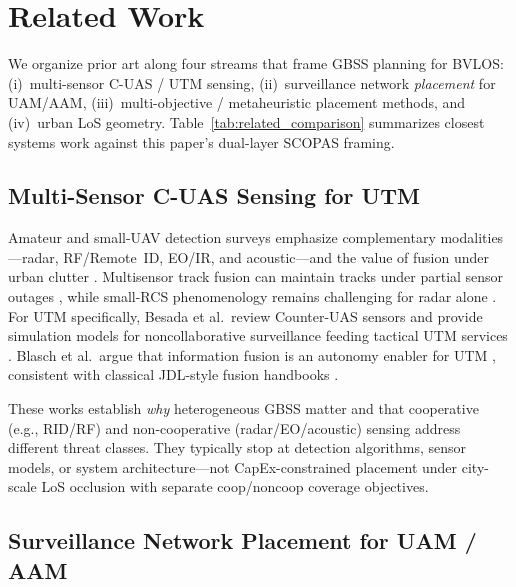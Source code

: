 
\section{Related Work}
\label{sec:related}

We organize prior art along four streams that frame GBSS planning for BVLOS: (i)~multi-sensor C-UAS / UTM sensing, (ii)~surveillance network \emph{placement} for UAM/AAM, (iii)~multi-objective / metaheuristic placement methods, and (iv)~urban LoS geometry. Table~\ref{tab:related_comparison} summarizes closest systems work against this paper's dual-layer SCOPAS framing.



\subsection{Multi-Sensor C-UAS Sensing for UTM}

Amateur and small-UAV detection surveys emphasize complementary modalities---radar, RF/Remote~ID, EO/IR, and acoustic---and the value of fusion under urban clutter \cite{guvenc2018detection,yan2023passive}. Multisensor track fusion can maintain tracks under partial sensor outages \cite{jovanoska2018multisensor,dudczyk2022multisensor}, while small-RCS phenomenology remains challenging for radar alone \cite{semkin2020analyzing}. For UTM specifically, Besada et al.\ review Counter-UAS sensors and provide simulation models for noncollaborative surveillance feeding tactical UTM services \cite{besada2022cuas}. Blasch et al.\ argue that information fusion is an autonomy enabler for UTM \cite{blasch2021information}, consistent with classical JDL-style fusion handbooks \cite{liggins2009handbook}.

These works establish \emph{why} heterogeneous GBSS matter and that cooperative (e.g., RID/RF) and non-cooperative (radar/EO/acoustic) sensing address different threat classes. They typically stop at detection algorithms, sensor models, or system architecture---not CapEx-constrained placement under city-scale LoS occlusion with separate coop/noncoop coverage objectives.

\subsection{Surveillance Network Placement for UAM / AAM}


